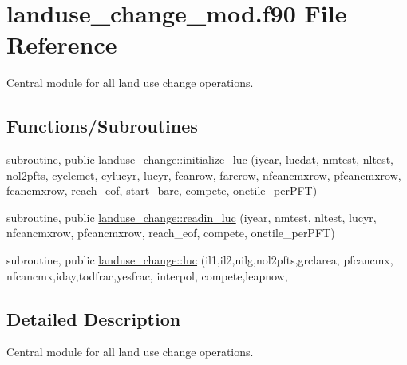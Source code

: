 \hypertarget{landuse__change__mod_8f90}{}\section{landuse\+\_\+change\+\_\+mod.\+f90 File Reference}
\label{landuse__change__mod_8f90}


Central module for all land use change operations.  


\subsection*{Functions/\+Subroutines}
{\bf }\par
\begin{DoxyCompactItemize}
\item 
subroutine, public \hyperlink{group__landuse__change__initialize__luc_gaaeec2aeebe84601010ea8cedab85c4c0}{landuse\+\_\+change\+::initialize\+\_\+luc} (iyear, lucdat, nmtest, nltest, nol2pfts, cyclemet, cylucyr, lucyr, fcanrow, farerow, nfcancmxrow, pfcancmxrow, fcancmxrow, reach\+\_\+eof, start\+\_\+bare, compete, onetile\+\_\+per\+P\+F\+T)
\end{DoxyCompactItemize}

{\bf }\par
\begin{DoxyCompactItemize}
\item 
subroutine, public \hyperlink{group__landuse__change__readin__luc_ga1d8b9a30b4c5c7692e39f3933bc2e13a}{landuse\+\_\+change\+::readin\+\_\+luc} (iyear, nmtest, nltest, lucyr, nfcancmxrow, pfcancmxrow, reach\+\_\+eof, compete, onetile\+\_\+per\+P\+F\+T)
\end{DoxyCompactItemize}

{\bf }\par
\begin{DoxyCompactItemize}
\item 
subroutine, public \hyperlink{group__landuse__change__luc_gaca416d24f2714c7a7de32fb9fb1033db}{landuse\+\_\+change\+::luc} (il1,il2,nilg,nol2pfts,grclarea, pfcancmx, nfcancmx,iday,todfrac,yesfrac, interpol, compete,leapnow,
\end{DoxyCompactItemize}

{\bf }\par

{\bf }\par



\subsection{Detailed Description}
Central module for all land use change operations. 

